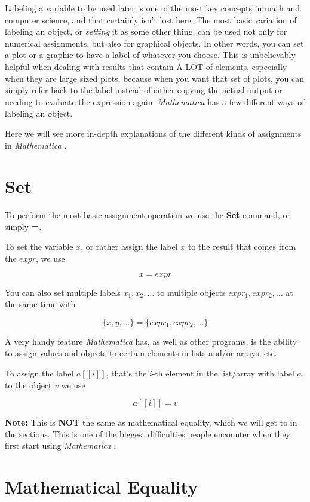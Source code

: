 \documentclass[11pt,letterpaper,twoside,titlepage]{book}
\newcommand{\Mathematica}{\textit{Mathematica} }
\begin{document}
			Labeling a variable to be used later is one of the most key concepts in math and computer science, and that certainly isn't lost here.  The most basic variation of labeling an object, or \emph{setting} it as some other thing, can be used not only for numerical assignments, but also for graphical objects.  In other words, you can set a plot or a graphic to have a label of whatever you choose.  This is unbelievably helpful when dealing with results that contain A LOT of elements, especially when they are large sized plots, because when you want that set of plots, you can simply refer back to the label instead of either copying the actual output or needing to evaluate the expression again.  \Mathematica has a few different ways of labeling an object. 
		
			Here we will see more in-depth explanations of the different kinds of assignments in \Mathematica.
			
			\section{Set}
			
				To perform the most basic assignment operation we use the \textbf{Set} command, or simply \textbf{=}.  
				
				To set the variable $x$, or rather assign the label $x$ to the result that comes from the $expr$, we use
				
				\[ x = expr \]
				
				You can also set multiple labels $ x_1, x_2,\ldots $ to multiple objects $ expr_1, expr_2, \ldots $ at the same time with
				
				\[ \{x,y,\ldots\} = \{expr_1, expr_2, \ldots\} \]
				
				A very handy feature \Mathematica has, as well as other programs, is the ability to assign values and objects to certain elements in lists and/or arrays, etc.  
				
				To assign the label $a[[i]]$, that's the $i$-th element in the list/array with label $a$, to the object $v$ we use
				
				\[ a[[i]] = v \]
				
				\textbf{Note:} This is \textbf{NOT} the same as mathematical equality, which we will get to in the sections.  This is one of the biggest difficulties people encounter when they first start using \Mathematica.
				
			\section{Mathematical Equality}
			
\end{document}
